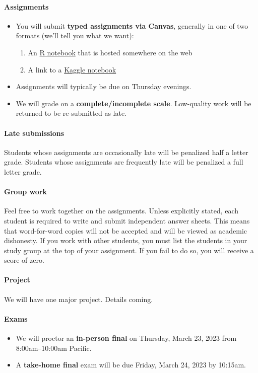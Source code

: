 \documentclass[10pt]{article}
\newcommand{\emf}[1]{\textbf{\textcolor{grass_green}{#1}}}
\begin{document}
\paragraph{Assignments}
\begin{itemize}
  \item You will submit \emf{typed assignments via Canvas}, generally in one of two formats (we'll tell you what we want):
  \begin{enumerate}
    \item An \href{https://www.rstudio.com/blog/r-notebooks/}{R notebook} that is hosted somewhere on the web
    \item A link to a \href{https://www.kaggle.com/docs/notebooks}{Kaggle notebook}
  \end{enumerate}
  \item Assignments will typically be due on Thursday evenings.
  \item We will grade on a \emf{complete/incomplete scale}. \newline Low-quality work will be returned to be re-submitted as late.
\end{itemize}

\paragraph{Late submissions} Students whose assignments are occasionally late will be penalized half a letter grade. Students whose assignments are frequently late will be penalized a full letter grade.

\paragraph{Group work} Feel free to work together on the assignments. Unless explicitly stated, each student is required to write and submit independent answer sheets. This means that word-for-word copies will not be accepted and will be viewed as academic dishonesty. If you work with other students, you must list the students in your study group at the top of your assignment. If you fail to do so, you will receive a score of zero.

\paragraph{Project} We will have one major project. Details coming.

\paragraph{Exams}
\begin{itemize}
  \item We will proctor an \emf{in-person final} on Thursday, March 23, 2023 from 8:00am--10:00am Pacific.
  \item A \emf{take-home final} exam will be due Friday, March 24, 2023 by 10:15am.
\end{itemize}
\end{document}
